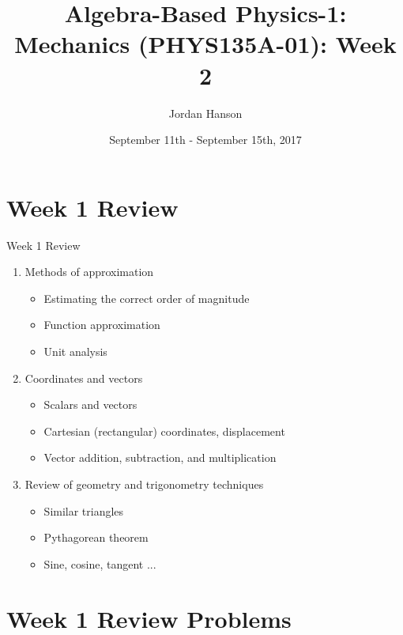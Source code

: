 \documentclass{beamer}
\title{Algebra-Based Physics-1: Mechanics (PHYS135A-01): Week 2}
\date{September 11th - September 15th, 2017}
\author{Jordan Hanson}
\institute{Whittier College Department of Physics and Astronomy}
\begin{document}
\maketitle

\section{Week 1 Review}

\begin{frame}{Week 1 Review}
\begin{enumerate}
\item Methods of approximation
\begin{itemize}
\item \alert{Estimating} the correct order of magnitude
\item \alert{Function} approximation
\item \alert{Unit analysis}
\end{itemize}
\item Coordinates and vectors
\begin{itemize}
\item \alert{Scalars} and \alert{vectors}
\item \alert{Cartesian} (rectangular) coordinates, displacement
\item \alert{Vector} addition, subtraction, and multiplication
\end{itemize}
\item Review of geometry and trigonometry techniques
\begin{itemize}
\item Similar triangles
\item Pythagorean theorem
\item Sine, cosine, tangent ...
\end{itemize}
\end{enumerate}
\end{frame}

\section{Week 1 Review Problems}
\end{document}
